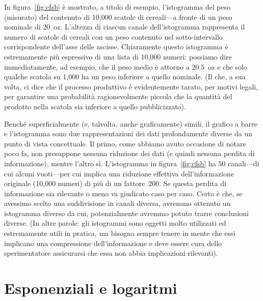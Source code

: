 
In figura~\ref{fig:cfsb} è mostrato, a titolo di esempio, l'istogramma del
peso (misurato) del contenuto di 10,000 scatole di cereali---a fronte di un
peso nominale di $20$~oz. L'altezza di ciascun canale dell'istogramma
rappresenta il numero di scatole di cereali con un peso contenuto nel
sotto-intervallo corrispondente dell'asse delle ascisse.
Chiaramente questo istogramma è estremamente più espressivo di una lista di
10,000 numeri: possiamo dire immediatamente, ad esempio, che il peso medio è
attorno a $20.5$~oz e che solo qualche scatola su 1,000 ha un peso inferiore a
quello nominale. (Il che, a sua volta, ci dice che il processo produttivo è
evidentemente tarato, per motivi legali, per garantire una probabilità
ragionevolmente piccola che la quantità del prodotto nella scatola sia
inferiore a quello pubblicizzato).

Benché superficialmente (e, talvolta, anche graficamente) simili, il grafico
a barre e l'istogramma sono due rappresentazioni dei dati profondamente diverse
da un punto di vista concettuale. Il primo, come abbiamo avuto occasione di
notare poco fa, non presuppone nessuna riduzione dei dati (e quindi nessuna
perdita di informazione), mentre l'altro sì. L'istogramma in
figura~\ref{fig:cfsb} ha $50$ canali---di cui alcuni vuoti---per cui implica
una riduzione effettiva dell'informazione originale (10,000 numeri) di più di
un fattore~$200$. Se questa perdita di informazione sia rilevante o meno va
giudicato caso per caso. Certo è che, se avessimo scelto una suddivisione
in canali diversa, avremmo ottenuto un istogramma diverso da cui, potenzialmente
avremmo potuto trarre conclusioni diverse. (In altre parole: gli istogrammi
sono oggetti molto utilizzati ed estremamente utili in pratica, ma bisogna
sempre tenere in mente che essi implicano una compressione dell'informazione e
deve essere cura dello sperimentatore assicurarsi che essa non abbia
implicazioni rilevanti).


\section{Esponenziali e logaritmi}
\label{sec:esponenziali_logaritmi}

